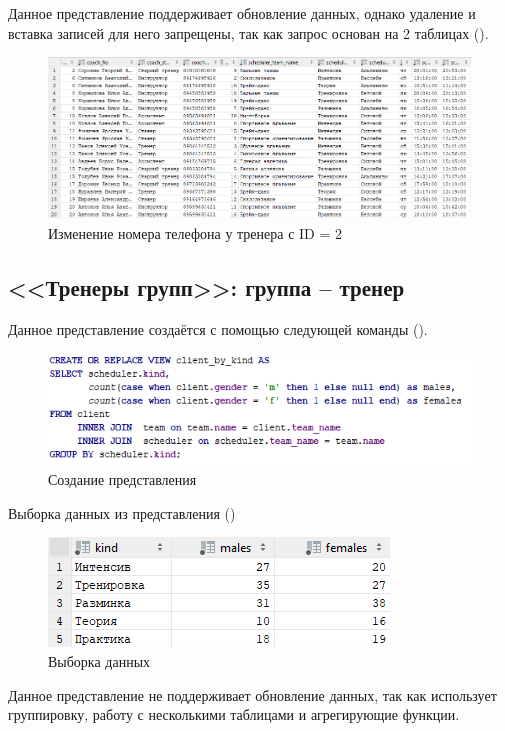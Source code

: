 \documentclass[a4paper,14pt]{article}
\begin{document}
	Данное представление поддерживает обновление данных, однако удаление и вставка записей для него запрещены, так как запрос основан на 2 таблицах ().
	
	\begin{figure}[H]
		\centering		
		\includegraphics[width=0.9\linewidth]{image/viewResult_02}
		\caption{Изменение номера телефона у тренера с ID = 2}\label{img:viewResult_02}
	\end{figure}

\subsection{<<Тренеры групп>>: группа – тренер}

	Данное представление создаётся с помощью следующей команды ().
	
	\begin{figure}[H]
		\centering		
		\includegraphics[width=0.7\linewidth]{image/viewCreate_03}
		\caption{Создание представления}\label{img:viewCreate_03}
	\end{figure}
	
	Выборка данных из представления ()
	
	\begin{figure}[H]
		\centering		
		\includegraphics[width=0.4\linewidth]{image/viewSelect_03}
		\caption{Выборка данных}\label{img:viewSelect_03}
	\end{figure}
	
	Данное представление не поддерживает обновление данных, так как использует группировку, работу с несколькими таблицами и агрегирующие функции.
\end{document}
